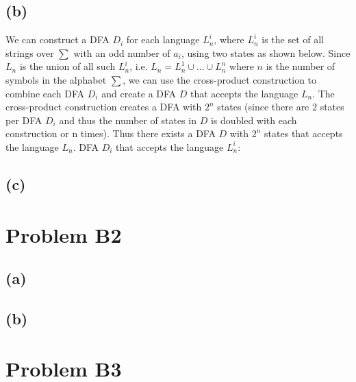 \documentclass[12pt]{article}
\begin{document}
\subsection*{(b)}
  We can construct a DFA $D_i$ for each language $L^i_n$, where $L^i_n$ is the
  set of all strings over $\sum$ with an odd number of $a_i$, using two states
  as shown below. Since $L_n$ is the union of all such $L^i_n$, i.e.
  $L_n = L^1_n \cup \dots \cup L^n_n$ where $n$ is the number of symbols in the
  alphabet $\sum$, we can use the cross-product construction to combine each
  DFA $D_i$ and create a DFA $D$ that accepts the language $L_n$.
  The cross-product construction creates a DFA with $2^n$ states (since there
  are 2 states per DFA $D_i$ and thus the number of states in $D$ is doubled
  with each construction or n times). Thus there exists a DFA $D$ with $2^n$
  states that accepts the language $L_n$.
  \vspace{0.5cm}
  DFA $D_i$ that accepts the language $L^i_n$:
  \newline
  \begin{center}
  \end{center}

\subsection*{(c)}
\section*{Problem B2}
\subsection*{(a)}
\subsection*{(b)}

\section*{Problem B3}
\end{document}
